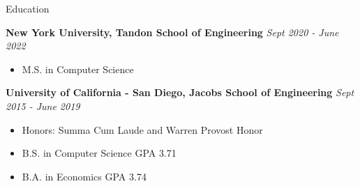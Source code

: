 \documentclass{resume} %
\begin{document}

\begin{rSection}{Education}

{\bf New York University, Tandon School of Engineering} \hfill {\em Sept 2020 - June 2022}\\
\vspace{-0.75cm}
\begin{itemize}[nosep]
\item M.S. in Computer Science
\end{itemize}

{\bf University of California - San Diego, Jacobs School of Engineering} \hfill {\em Sept 2015 - June 2019}
\vspace{-0.25cm}
\begin{itemize} [nosep]
\item Honors: Summa Cum Laude and Warren Provost Honor
\item B.S. in Computer Science \hspace{1cm} GPA 3.71
\item B.A. in Economics \hspace{2.3cm}GPA 3.74
\end{itemize}
\end{rSection}
\end{document}
